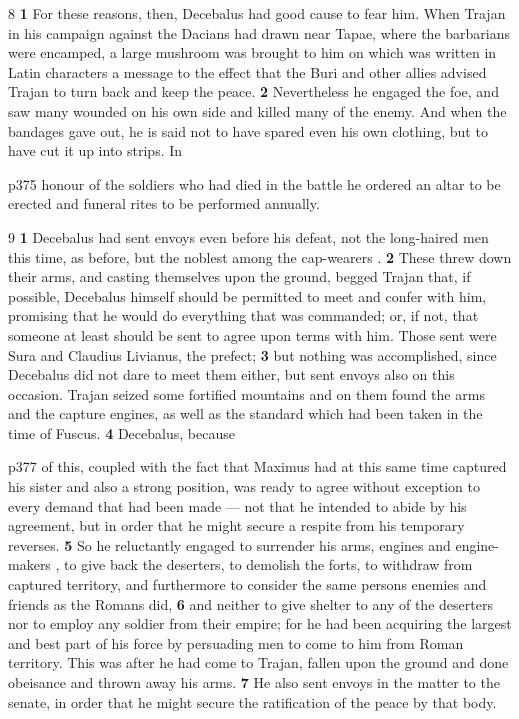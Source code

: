 8 \textbf{1} For these reasons, then, Decebalus had good cause to fear him. When Trajan in his campaign against the Dacians had drawn near Tapae, where the barbarians were encamped, a large mushroom was brought to him on which was written in Latin characters a message to the effect that the Buri and other allies advised Trajan to turn back and keep the peace. \textbf{2} Nevertheless he engaged the foe, and saw many wounded on his own side and killed many of the enemy. And when the bandages gave out, he is said not to have spared even his own clothing, but to have cut it up into strips. In

p375 honour of the soldiers who had died in the battle he ordered an altar to be erected and funeral rites to be performed annually.

9 \textbf{1} Decebalus had sent envoys even before his defeat, not the long-haired men this time, as before, but the noblest among the cap-wearers . \textbf{2} These threw down their arms, and casting themselves upon the ground, begged Trajan that, if possible, Decebalus himself should be permitted to meet and confer with him, promising that he would do everything that was commanded; or, if not, that someone at least should be sent to agree upon terms with him. Those sent were Sura and Claudius Livianus, the prefect; \textbf{3} but nothing was accomplished, since Decebalus did not dare to meet them either, but sent envoys also on this occasion. Trajan seized some fortified mountains and on them found the arms and the capture engines, as well as the standard which had been taken in the time of Fuscus. \textbf{4} Decebalus, because

p377 of this, coupled with the fact that Maximus had at this same time captured his sister and also a strong position, was ready to agree without exception to every demand that had been made \texthebrew{—} not that he intended to abide by his agreement, but in order that he might secure a respite from his temporary reverses. \textbf{5} So he reluctantly engaged to surrender his arms, engines and engine-makers , to give back the deserters, to demolish the forts, to withdraw from captured territory, and furthermore to consider the same persons enemies and friends as the Romans did, \textbf{6} and neither to give shelter to any of the deserters nor to employ any soldier from their empire; for he had been acquiring the largest and best part of his force by persuading men to come to him from Roman territory. This was after he had come to Trajan, fallen upon the ground and done obeisance and thrown away his arms. \textbf{7} He also sent envoys in the matter to the senate, in order that he might secure the ratification of the peace by that body.

